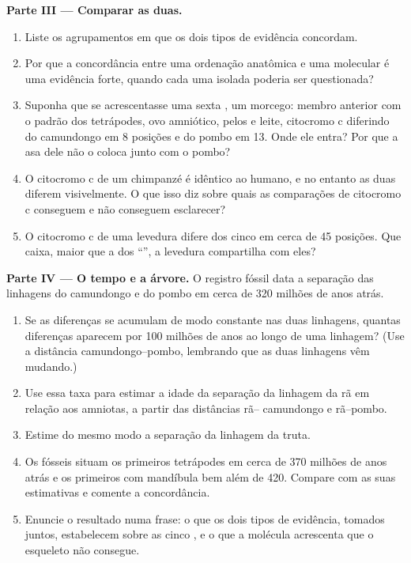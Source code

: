\begin{problem}
\medskip
\noindent\textbf{Parte III --- Comparar as duas.}
\begin{enumerate}[resume]
  \item Liste os agrupamentos em que os dois tipos de evidência
        concordam.
  \item Por que a concordância entre uma ordenação anatômica e uma
        molecular é uma evidência forte, quando cada uma isolada
        poderia ser questionada?
  \item Suponha que se acrescentasse uma sexta , um morcego:
        membro anterior com o padrão dos tetrápodes, ovo amniótico,
        pelos e leite, citocromo c diferindo do camundongo em 8
        posições e do pombo em 13. Onde ele entra? Por que a asa dele
        não o coloca junto com o pombo?
  \item O citocromo c de um chimpanzé é idêntico ao humano, e no
        entanto as duas  diferem visivelmente. O que isso diz
        sobre quais  as comparações de citocromo c conseguem e não
        conseguem esclarecer?
  \item O citocromo c de uma levedura difere dos cinco em cerca de 45
        posições. Que caixa, maior que a dos ``'', a
        levedura compartilha com eles?
\end{enumerate}

\medskip
\noindent\textbf{Parte IV --- O tempo e a árvore.}
O registro fóssil data a separação das linhagens do camundongo e do
pombo em cerca de 320 milhões de anos atrás.
\begin{enumerate}[resume]
  \item Se as diferenças se acumulam de modo constante nas duas
        linhagens, quantas diferenças aparecem por 100 milhões de anos
        ao longo de uma linhagem? (Use a distância
        camundongo--pombo, lembrando que as duas linhagens vêm
        mudando.)
  \item Use essa taxa para estimar a idade da separação da linhagem da
        rã em relação aos amniotas, a partir das distâncias rã--
        camundongo e rã--pombo.
  \item Estime do mesmo modo a separação da linhagem da truta.
  \item Os fósseis situam os primeiros tetrápodes em cerca de 370
        milhões de anos atrás e os primeiros  com mandíbula
        bem além de 420. Compare com as suas estimativas e comente a
        concordância.
  \item Enuncie o resultado numa frase: o que os dois tipos de
        evidência, tomados juntos, estabelecem sobre as cinco ,
        e o que a molécula acrescenta que o esqueleto não consegue.
\end{enumerate}
\end{problem}
